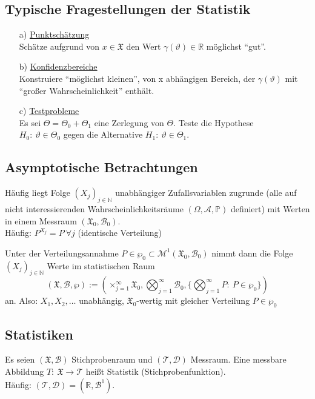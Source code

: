 \documentclass[a4paper,11pt,twoside,titlepage]{article}
\newcommand{\R}{{\mathbb R}}
\newcommand{\N}{{\mathbb N}}
\newcommand{\PP}{{\mathbb P}} %
\newcommand{\XX}{{\mathfrak X}} %
\newcommand{\MM}{{\mathcal M}}
\newcommand\AAA{ \mathcal{A} } %
\newcommand\BB{ \mathcal{B} } %
\newcommand\DD{ \mathcal{D} } %
\newcommand\TT{ \mathcal{T} }
\begin{document}
\subsection{Typische Fragestellungen der Statistik}
\begin{itemize}
\item[a) ]\underline{Punktschätzung}\\Schätze aufgrund von $x\in\XX$ den Wert $\gamma(\vartheta)\in\R$ möglichst "`gut"'.
\item[b) ]\underline{Konfidenzbereiche}\\Konstruiere "`möglichst kleinen"', von x abhängigen Bereich, der $\gamma(\vartheta)$ mit "`großer Wahrscheinlichkeit"' enthält.
\item[c) ]\underline{Testprobleme}\\Es sei $\Theta=\Theta_0+\Theta_1$ eine Zerlegung von $\Theta$. Teste die Hypothese\\ $H_0:\ \vartheta\in\Theta_0$ gegen die Alternative $H_1:\ \vartheta\in\Theta_1$.
\end{itemize}


\subsection{Asymptotische Betrachtungen}
Häufig liegt Folge $(X_j)_{j\in\N}$ unabhängiger Zufallsvariablen zugrunde (alle auf nicht interessierenden Wahrscheinlichkeitsräume $(\Omega,\AAA,\PP)$ definiert) mit Werten in einem Messraum $(\XX_0,\BB_0)$.\\
Häufig: $P^{X_j}=P\ \forall j$ (identische Verteilung)

Unter der Verteilungsannahme $P\in\wp_0\subset\MM^1(\XX_0,\BB_0)$ nimmt dann die Folge $(X_j)_{j\in\N}$ Werte im statistischen Raum $$(\XX,\BB,\wp):=(\times_{j=1}^\infty\XX_0,\bigotimes_{j=1}^\infty\BB_0,\{\bigotimes_{j=1}^\infty P:\ P\in\wp_0\})$$
an. Also: $X_1,X_2,\ldots$ unabhängig, $\XX_0$-wertig mit gleicher Verteilung $P\in\wp_0$

\subsection{Statistiken}
Es seien $(\XX,\BB)$ Stichprobenraum und $(\TT,\DD)$ Messraum. Eine messbare Abbildung $T:\ \XX\to\TT$ heißt Statistik (Stichprobenfunktion).\\Häufig: $(\TT,\DD)=(\R,\BB^1)$.
\end{document}
